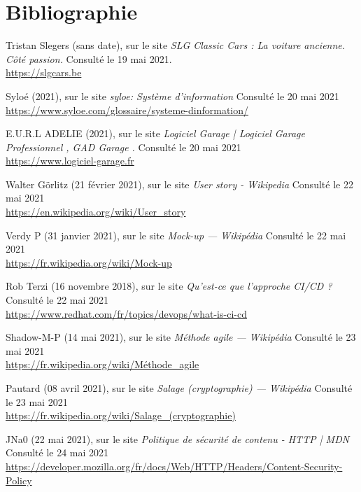 \section{Bibliographie}

\renewcommand{\section}[2]{}%
\begin{thebibliography}{}

Tristan Slegers (sans date), sur le site \textit{SLG Classic Cars : La voiture ancienne. Côté passion.} Consulté le 19 mai 2021.
\\\url{https://slgcars.be}

Syloé (2021), sur le site \textit{syloe: Système d'information} Consulté le 20 mai 2021
\\\url{https://www.syloe.com/glossaire/systeme-dinformation/}

E.U.R.L ADELIE (2021), sur le site \textit{Logiciel Garage | Logiciel Garage Professionnel , GAD Garage .} Consulté le 20 mai 2021
\\\url{https://www.logiciel-garage.fr}

Walter Görlitz (21 février 2021), sur le site \textit{User story - Wikipedia} Consulté le 22 mai 2021
\\\url{https://en.wikipedia.org/wiki/User_story}

Verdy P (31 janvier 2021), sur le site \textit{Mock-up — Wikipédia} Consulté le 22 mai 2021
\\\url{https://fr.wikipedia.org/wiki/Mock-up}

Rob Terzi (16 novembre 2018), sur le site \textit{Qu'est-ce que l'approche CI/CD ?} Consulté le 22 mai 2021
\\\url{https://www.redhat.com/fr/topics/devops/what-is-ci-cd}

Shadow-M-P (14 mai 2021), sur le site \textit{Méthode agile — Wikipédia} Consulté le 23 mai 2021
\\\url{https://fr.wikipedia.org/wiki/Méthode_agile}

Pautard (08 avril 2021), sur le site \textit{Salage (cryptographie) — Wikipédia} Consulté le 23 mai 2021
\\\url{https://fr.wikipedia.org/wiki/Salage_(cryptographie)}

JNa0 (22 mai 2021), sur le site \textit{Politique de sécurité de contenu - HTTP | MDN} Consulté le 24 mai 2021
\\\url{https://developer.mozilla.org/fr/docs/Web/HTTP/Headers/Content-Security-Policy}


\end{thebibliography}
